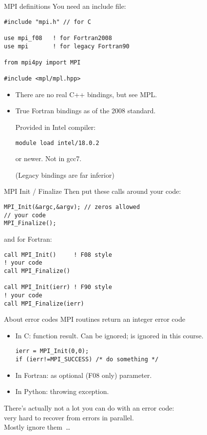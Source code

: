 
\begin{mpithree}
\begin{frame}[containsverbatim]{MPI definitions}
\label{sl:mpi-header}
You need an include file:
\begin{verbatim}
#include "mpi.h" // for C

use mpi_f08   ! for Fortran2008
use mpi       ! for legacy Fortran90

from mpi4py import MPI
  
#include <mpl/mpl.hpp>
\end{verbatim}
\begin{itemize}
\item There are no real C++ bindings, but see MPL.
\item True Fortran bindings as of the 2008 standard.
\begin{tacc}
Provided in Intel compiler:
\begin{verbatim}
module load intel/18.0.2
\end{verbatim}
or newer. Not in gcc7.
\end{tacc}
(Legacy bindings are far inferior)
\end{itemize}
\end{frame}

\begin{frame}[containsverbatim]{MPI Init / Finalize}
Then put these calls around your code:
\lstset{language=C}
\begin{lstlisting}
MPI_Init(&argc,&argv); // zeros allowed
// your code
MPI_Finalize();  
\end{lstlisting}
and for Fortran:
\lstset{language=Fortran}
\begin{lstlisting}
call MPI_Init()     ! F08 style
! your code
call MPI_Finalize()

call MPI_Init(ierr) ! F90 style
! your code
call MPI_Finalize(ierr)
\end{lstlisting}
\end{frame}
\end{mpithree}

\begin{frame}[containsverbatim]{About error codes}
  MPI routines return an integer error code
  \begin{itemize}
  \item In C: function result. Can be ignored; is ignored in this course.
\lstset{language=C++}
\begin{lstlisting}
ierr = MPI_Init(0,0);
if (ierr!=MPI_SUCCESS) /* do something */
\end{lstlisting}
  \item In Fortran: as optional (F08 only) parameter.
  \item In Python: throwing exception.
  \end{itemize}
  There's actually not a lot you can do with an error code:\\
  very hard to recover from errors in parallel.\\
  Mostly ignore them~\ldots
\end{frame}

